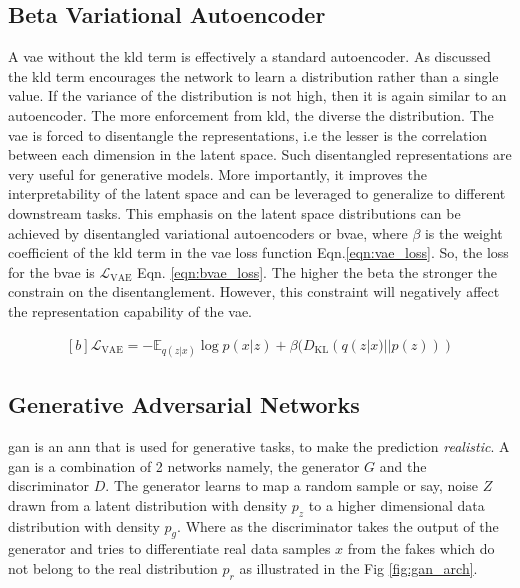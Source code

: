 \subsection{Beta Variational Autoencoder}
\label{subsec:bvae}
A \ac{vae} without the \ac{kld} term is effectively a standard autoencoder. As discussed the \ac{kld} term encourages the network to learn a distribution rather than a single value. If the variance of the distribution is not high, then it is again similar to an autoencoder. The more enforcement from \ac{kld}, the diverse the distribution. The \ac{vae} is forced to disentangle the representations, i.e the lesser is the correlation between each dimension in the latent space. Such disentangled representations are very useful for generative models. More importantly, it improves the interpretability of the latent space and can be leveraged to generalize to different downstream tasks. This emphasis on the latent space distributions can be achieved by disentangled variational autoencoders or \ac{bvae}, where $\beta$ is the weight coefficient of the \ac{kld} term in the \ac{vae} loss function Eqn.\ref{eqn:vae_loss}. So, the loss for the \ac{bvae} is $\mathcal{L}_{\mathrm{VAE}}$ Eqn. \ref{eqn:bvae_loss}. The higher the beta the stronger the constrain on the disentanglement. However, this constraint will negatively affect the representation capability of the \ac{vae}.

\begin{equation} \label{eqn:bvae_loss}
    \begin{gathered}[b]
        \mathcal{L}_{\mathrm{VAE}}=-\mathbb{E}_{q(z | x)} \log p(x | z) + \beta (D_{\mathrm{KL}}(q(z | x) || p(z)))
    \end{gathered}
\end{equation}

\subsection{Generative Adversarial Networks}
\ac{gan} is an \ac{ann} that is used for generative tasks, to make the prediction \textit{realistic}. A \ac{gan} is a combination of 2 networks namely, the generator $G$ and the discriminator $D$. The generator learns to map a random sample or say, noise $Z$ drawn from a latent distribution with density $p_{z}$ to a higher dimensional data distribution with density $p_{g}$. Where as the discriminator takes the output of the generator and tries to differentiate real data samples $x$ from the fakes which do not belong to the real distribution $p_{r}$  as illustrated in the Fig \ref{fig:gan_arch}.

